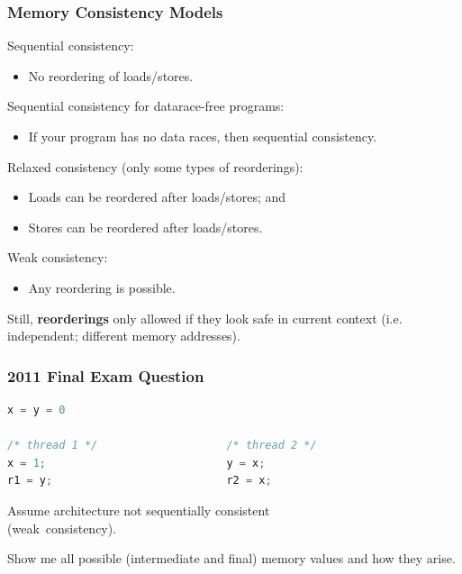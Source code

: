 \begin{frame}
  \frametitle{Memory Consistency Models}

  
    Sequential consistency:
      \begin{itemize}
        \item No reordering of loads/stores.
      \end{itemize}
    Sequential consistency for datarace-free programs:
      \begin{itemize}
        \item If your program
  has no data races, then sequential consistency.
      \end{itemize}
    Relaxed consistency (only some types of reorderings):
      \begin{itemize}
        \item Loads can be reordered after loads/stores; and
        \item Stores can be reordered after loads/stores.
      \end{itemize}
    Weak consistency:
      \begin{itemize}
        \item Any reordering is possible.
      \end{itemize}

  Still, {\bf reorderings} only allowed if they look safe in current context
  (i.e. independent; different memory addresses).
  
\end{frame}

\begin{frame}[fragile]
  \frametitle{2011 Final Exam Question}

  
  \begin{lstlisting}[language=C]
                       x = y = 0

/* thread 1 */                    /* thread 2 */
x = 1;                            y = x;
r1 = y;                           r2 = x;
  \end{lstlisting}

  Assume architecture not sequentially consistent\\ \hspace*{3em} (weak~consistency).

  Show me all possible (intermediate and final) memory values and how they arise.
  
\end{frame}

